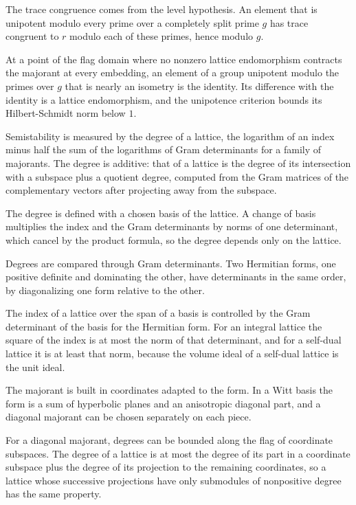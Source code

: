 The trace congruence comes from the level hypothesis. An element that is unipotent modulo every prime
over a completely split prime $g$ has trace congruent to $r$ modulo each of these primes, hence
modulo $g$.

At a point of the flag domain where no nonzero lattice endomorphism contracts the majorant at every
embedding, an element of a group unipotent modulo the primes over $g$ that is nearly an isometry is
the identity. Its difference
with the identity is a lattice endomorphism, and the unipotence criterion bounds its Hilbert-Schmidt
norm below $1$.

Semistability is measured by the degree of a lattice, the logarithm of an index minus half the sum
of the logarithms of Gram determinants for a family of majorants. The degree is additive: that of a
lattice is the degree of its intersection with a subspace plus a quotient degree, computed from the
Gram matrices of the complementary vectors after projecting away from the subspace.

The degree is defined with a chosen basis of the lattice. A change of basis multiplies the index and
the Gram determinants by norms of one determinant, which cancel by the product formula, so the degree
depends only on the lattice.

Degrees are compared through Gram determinants. Two Hermitian forms, one positive definite and
dominating the other, have determinants in the same order, by diagonalizing one form relative to the
other.

The index of a lattice over the span of a basis is controlled by the Gram determinant of the basis for
the Hermitian form. For an integral lattice the square of the index is at most the norm of that
determinant, and for a self-dual lattice it is at least that norm, because the volume ideal of a
self-dual lattice is the unit ideal.

The majorant is built in coordinates adapted to the form. In a Witt basis the form is a sum of
hyperbolic planes and an anisotropic diagonal part, and a diagonal majorant can be chosen separately
on each piece.

For a diagonal majorant, degrees can be bounded along the flag of coordinate subspaces. The degree of
a lattice is at most the degree of its part in a coordinate subspace plus the degree of its
projection to the remaining coordinates, so a lattice whose successive projections have only
submodules of nonpositive degree has the same property.

